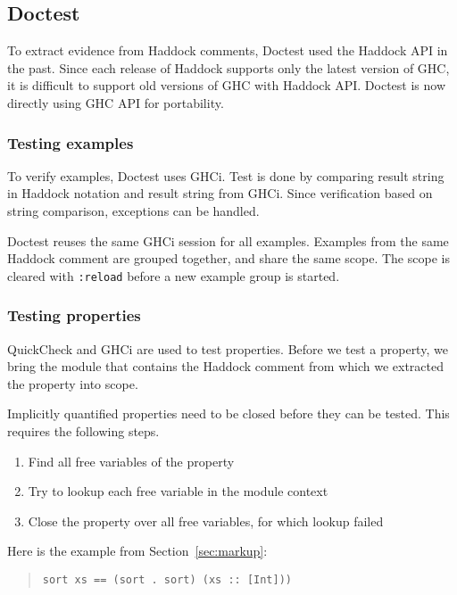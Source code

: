 \documentclass[preprint]{sigplanconf}
\begin{document}
\subsection{Doctest}
\label{sec:doctest}

To extract evidence from Haddock comments,
Doctest used the Haddock API in the past.
Since each release of Haddock supports only the latest version of GHC,
it is difficult to support old versions of GHC with Haddock API.
Doctest is now directly using GHC API for portability.

\subsubsection{Testing examples}

To verify examples, Doctest uses GHCi.
Test is done by comparing result string in Haddock notation and
result string from GHCi.
Since verification based on string comparison, exceptions can be handled.

Doctest reuses the same GHCi session for all examples.
Examples from the same Haddock comment are grouped together,
and share the same scope.
The scope is cleared with \verb|:reload| before a new
example group is started.

\subsubsection{Testing properties}

\noindent QuickCheck and GHCi are used to test properties.  Before we
test a property, we bring the module that contains the Haddock comment
from which we extracted the property into scope.

Implicitly quantified properties need to be closed before they can be
tested.  This requires the following steps.
\begin{enumerate}
    \item
        Find all free variables of the property
    \item
        Try to lookup each free variable in the module context
    \item
        Close the property over all free variables, for which lookup
        failed
\end{enumerate}

\noindent Here is the example from Section~\ref{sec:markup}:

\begin{quote}
\small
\begin{verbatim}
sort xs == (sort . sort) (xs :: [Int]))
\end{verbatim}
\end{quote}
\end{document}
